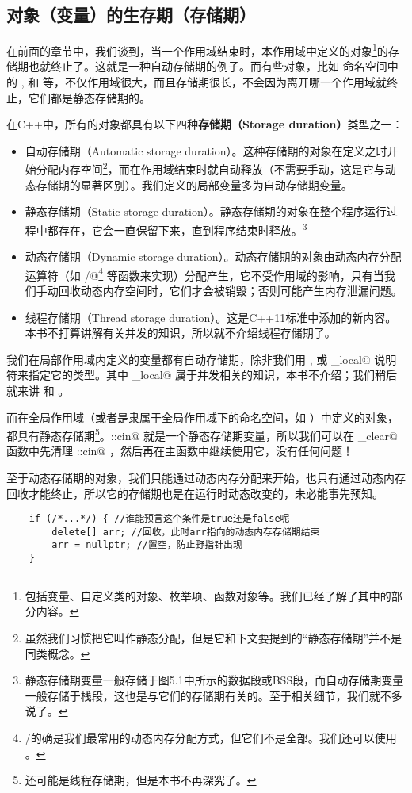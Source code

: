 \subsection*{对象（变量）的生存期（存储期）}
在前面的章节中，我们谈到，当一个作用域结束时，本作用域中定义的对象\footnote{包括变量、自定义类的对象、枚举项、函数对象等。我们已经了解了其中的部分内容。}的存储期也就终止了。这就是一种自动存储期的例子。而有些对象，比如 \lstinline@std@ 命名空间中的 \lstinline@cin@, \lstinline@cout@ 和 \lstinline@endl@ 等，不仅作用域很大，而且存储期很长，不会因为离开哪一个作用域就终止，它们都是静态存储期的。\par
在C++中，所有的对象都具有以下四种\textbf{存储期（Storage duration）}类型之一：
\begin{itemize}
    \item 自动存储期（Automatic storage duration）。这种存储期的对象在定义之时开始分配内存空间\footnote{虽然我们习惯把它叫作静态分配，但是它和下文要提到的``静态存储期''并不是同类概念。}，而在作用域结束时就自动释放（不需要手动，这是它与动态存储期的显著区别）。我们定义的局部变量多为自动存储期变量。
    \item 静态存储期（Static storage duration）。静态存储期的对象在整个程序运行过程中都存在，它会一直保留下来，直到程序结束时释放。\footnote{静态存储期变量一般存储于图5.1中所示的数据段或BSS段，而自动存储期变量一般存储于栈段，这也是与它们的存储期有关的。至于相关细节，我们就不多说了。}
    \item 动态存储期（Dynamic storage duration）。动态存储期的对象由动态内存分配运算符（如 \lstinline@new@/\lstinline@new[]@\footnote{\lstinline@new@/\lstinline@delete@ 的确是我们最常用的动态内存分配方式，但它们不是全部。我们还可以使用 \lstinline@malloc@。} 等函数来实现）分配产生，它不受作用域的影响，只有当我们手动回收动态内存空间时，它们才会被销毁；否则可能产生内存泄漏问题。
    \item 线程存储期（Thread storage duration）。这是C++11标准中添加的新内容。本书不打算讲解有关并发的知识，所以就不介绍线程存储期了。
\end{itemize}\par
我们在局部作用域内定义的变量都有自动存储期，除非我们用 \lstinline@static@, \lstinline@extern@ 或 \lstinline@thread_local@ 说明符来指定它的类型。其中 \lstinline@thread_local@ 属于并发相关的知识，本书不介绍；我们稍后就来讲 \lstinline@static@ 和 \lstinline@extern@。\par
而在全局作用域（或者是隶属于全局作用域下的命名空间，如 \lstinline@std@）中定义的对象，都具有静态存储期\footnote{还可能是线程存储期，但是本书不再深究了。}。\lstinline@std::cin@ 就是一个静态存储期变量，所以我们可以在 \lstinline@input_clear@ 函数中先清理 \lstinline@std::cin@ ，然后再在主函数中继续使用它，没有任何问题！\par
至于动态存储期的对象，我们只能通过动态内存分配来开始，也只有通过动态内存回收才能终止，所以它的存储期也是在运行时动态改变的，未必能事先预知。
\begin{lstlisting}
    if (/*...*/) { //谁能预言这个条件是true还是false呢
        delete[] arr; //回收，此时arr指向的动态内存存储期结束
        arr = nullptr; //置空，防止野指针出现
    }
\end{lstlisting}
